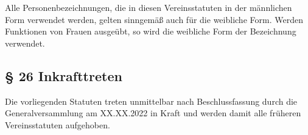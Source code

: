 \documentclass[11pt,a4paper]{article}
\begin{document}
Alle Personenbezeichnungen, die in diesen Vereinsstatuten in der männlichen Form verwendet werden, gelten sinngemäß auch für die weibliche Form.
Werden Funktionen von Frauen ausgeübt, so wird die weibliche Form der Bezeichnung verwendet.

\subsection{§ 26
Inkrafttreten}

Die vorliegenden Statuten treten unmittelbar nach Beschlussfassung durch die Generalversammlung am XX.XX.2022 in Kraft und werden damit alle früheren Vereinsstatuten aufgehoben.
\end{document}
